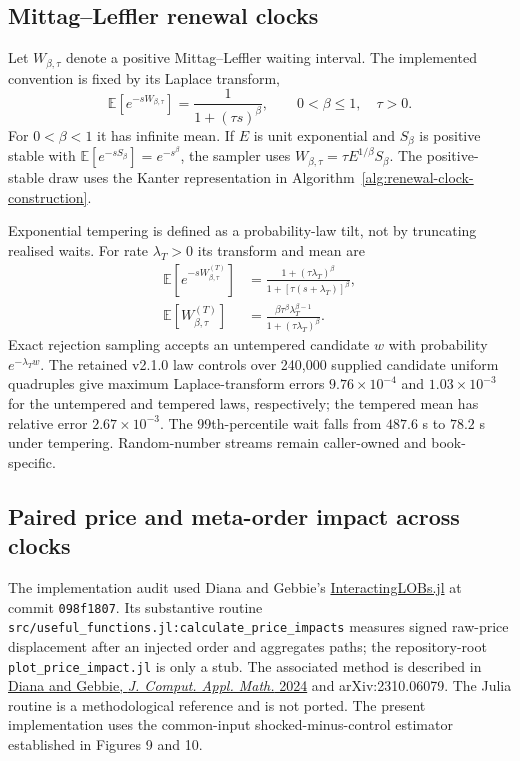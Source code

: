 
\subsection{Mittag--Leffler renewal clocks}
\label{app:mittag-leffler-clocks}

Let $W_{\beta,\tau}$ denote a positive Mittag--Leffler waiting interval.  The
implemented convention is fixed by its Laplace transform,
\begin{equation}
\mathbb E[e^{-sW_{\beta,\tau}}]
=\frac{1}{1+(\tau s)^\beta},
\qquad 0<\beta\leq1,\quad \tau>0.
\label{eq:ml-wait-laplace}
\end{equation}
For $0<\beta<1$ it has infinite mean.  If $E$ is unit exponential and
$S_\beta$ is positive stable with
$\mathbb E[e^{-sS_\beta}]=e^{-s^\beta}$, the sampler uses
$W_{\beta,\tau}=\tau E^{1/\beta}S_\beta$.  The positive-stable draw uses the
Kanter representation in Algorithm~\ref{alg:renewal-clock-construction}.

Exponential tempering is defined as a probability-law tilt, not by truncating
realised waits.  For rate $\lambda_T>0$ its transform and mean are
\begin{align}
\mathbb E[e^{-sW^{(T)}_{\beta,\tau}}]
&=\frac{1+(\tau\lambda_T)^\beta}
{1+[\tau(s+\lambda_T)]^\beta},
\label{eq:tempered-ml-laplace}\\
\mathbb E[W^{(T)}_{\beta,\tau}]
&=\frac{\beta\tau^\beta\lambda_T^{\beta-1}}
{1+(\tau\lambda_T)^\beta}.
\label{eq:tempered-ml-mean}
\end{align}
Exact rejection sampling accepts an untempered candidate $w$ with probability
$e^{-\lambda_Tw}$.  The retained v2.1.0 law controls over 240,000 supplied candidate
uniform quadruples give maximum Laplace-transform errors $9.76\times10^{-4}$
and $1.03\times10^{-3}$ for the untempered and tempered laws, respectively;
the tempered mean has relative error $2.67\times10^{-3}$.  The 99th-percentile
wait falls from $487.6$ s to $78.2$ s under tempering.  Random-number streams
remain caller-owned and book-specific.

\subsection{Paired price and meta-order impact across clocks}
\label{app:clock-impact}

The implementation audit used Diana and Gebbie's
\href{https://github.com/DerickDiana/InteractingLOBs.jl}{InteractingLOBs.jl}
at commit \texttt{098f1807}.  Its substantive routine
\texttt{src/useful\_functions.jl:calculate\_price\_impacts} measures signed
raw-price displacement after an injected order and aggregates paths; the
repository-root \texttt{plot\_price\_impact.jl} is only a stub.  The associated
method is described in
\href{https://doi.org/10.1016/j.cam.2024.116202}{Diana and Gebbie,
\emph{J. Comput. Appl. Math.} 2024} and arXiv:2310.06079.  The Julia routine is
a methodological reference and is not ported.  The present implementation uses
the common-input shocked-minus-control estimator established in Figures 9 and
10.

